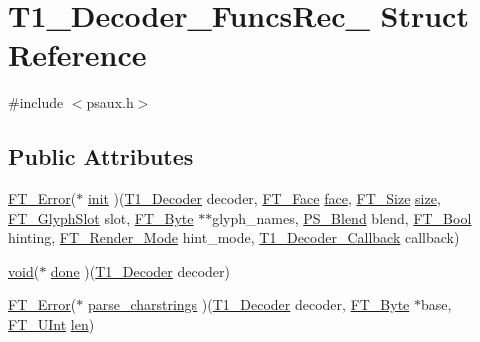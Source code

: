 \hypertarget{struct_t1___decoder___funcs_rec__}{\section{T1\-\_\-\-Decoder\-\_\-\-Funcs\-Rec\-\_\- Struct Reference}
\label{struct_t1___decoder___funcs_rec__}
}


{\ttfamily \#include $<$psaux.\-h$>$}

\subsection*{Public Attributes}
\begin{DoxyCompactItemize}
\item 
\hyperlink{fttypes_8h_a64c8060bdb3d6eec844a1bf670e06bdd}{F\-T\-\_\-\-Error}($\ast$ \hyperlink{struct_t1___decoder___funcs_rec___a10baf5f433631fb6e73e639fca7e9478}{init} )(\hyperlink{psaux_8h_a428b7bd32678ab7b0a785ee699ecc2b6}{T1\-\_\-\-Decoder} decoder, \hyperlink{freetype_8h_a7eba045ee20968354fa1bff0f69740fa}{F\-T\-\_\-\-Face} \hyperlink{glew_8h_a676ca580c460c0154eb58200433d2a9e}{face}, \hyperlink{freetype_8h_a791d0ff3273ca9628a523efd98d138c1}{F\-T\-\_\-\-Size} \hyperlink{_free_image_8h_a3d1e3edfcf61ca2d831883e1afbad89e}{size}, \hyperlink{freetype_8h_a768daa0d9c3fa499e6c37034ee9f2ca3}{F\-T\-\_\-\-Glyph\-Slot} slot, \hyperlink{fttypes_8h_a51f26183ca0c9f4af958939648caeccd}{F\-T\-\_\-\-Byte} $\ast$$\ast$glyph\-\_\-names, \hyperlink{t1tables_8h_aa6585837cd3e553b7c3d969f8afc3b17}{P\-S\-\_\-\-Blend} blend, \hyperlink{fttypes_8h_a1a832a256bb5a7e6e884afaa1a07f3ae}{F\-T\-\_\-\-Bool} hinting, \hyperlink{freetype_8h_aaa0488bc4d2c5f0a6f4311ddee8edfb7}{F\-T\-\_\-\-Render\-\_\-\-Mode} hint\-\_\-mode, \hyperlink{psaux_8h_a1544a8bc91e0e623a78dbda256e0d03e}{T1\-\_\-\-Decoder\-\_\-\-Callback} callback)
\item 
\hyperlink{wglew_8h_aeea6e3dfae3acf232096f57d2d57f084}{void}($\ast$ \hyperlink{struct_t1___decoder___funcs_rec___a2d76ed11eab173c09dc8f5cde75a64ee}{done} )(\hyperlink{psaux_8h_a428b7bd32678ab7b0a785ee699ecc2b6}{T1\-\_\-\-Decoder} decoder)
\item 
\hyperlink{fttypes_8h_a64c8060bdb3d6eec844a1bf670e06bdd}{F\-T\-\_\-\-Error}($\ast$ \hyperlink{struct_t1___decoder___funcs_rec___a921b7ac2c00f97c425643c5a612b3c38}{parse\-\_\-charstrings} )(\hyperlink{psaux_8h_a428b7bd32678ab7b0a785ee699ecc2b6}{T1\-\_\-\-Decoder} decoder, \hyperlink{fttypes_8h_a51f26183ca0c9f4af958939648caeccd}{F\-T\-\_\-\-Byte} $\ast$base, \hyperlink{fttypes_8h_abcb8db4dbf35d2b55a9e8c7b0926dc52}{F\-T\-\_\-\-U\-Int} \hyperlink{glew_8h_a652168017ea9a8bbcead03d5c16269fb}{len})
\end{DoxyCompactItemize}



